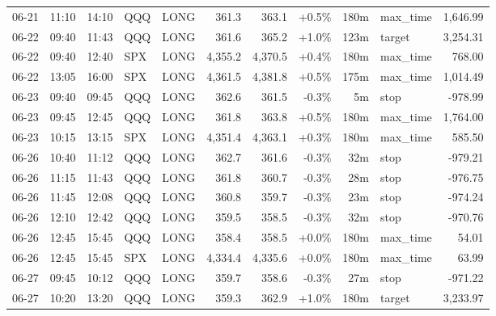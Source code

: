 \documentclass[11pt,a4paper,twoside]{article}
\begin{document}
\begin{center}
\begin{longtable}{>{\color{txtmain}}l l l l l r r r r >{\color{txtmain}}l r}
06-21 & 11:10 & 14:10 & QQQ & LONG & 361.3 & 363.1 & \textcolor{wingreen}{+0.5\%} & 180m & max\_time & \textcolor{wingreen}{1,646.99} \\
06-22 & 09:40 & 11:43 & QQQ & LONG & 361.6 & 365.2 & \textcolor{wingreen}{+1.0\%} & 123m & target & \textcolor{wingreen}{3,254.31} \\
06-22 & 09:40 & 12:40 & SPX & LONG & 4,355.2 & 4,370.5 & \textcolor{wingreen}{+0.4\%} & 180m & max\_time & \textcolor{wingreen}{768.00} \\
06-22 & 13:05 & 16:00 & SPX & LONG & 4,361.5 & 4,381.8 & \textcolor{wingreen}{+0.5\%} & 175m & max\_time & \textcolor{wingreen}{1,014.49} \\
06-23 & 09:40 & 09:45 & QQQ & LONG & 362.6 & 361.5 & \textcolor{lossred}{-0.3\%} & 5m & stop & \textcolor{lossred}{-978.99} \\
06-23 & 09:45 & 12:45 & QQQ & LONG & 361.8 & 363.8 & \textcolor{wingreen}{+0.5\%} & 180m & max\_time & \textcolor{wingreen}{1,764.00} \\
06-23 & 10:15 & 13:15 & SPX & LONG & 4,351.4 & 4,363.1 & \textcolor{wingreen}{+0.3\%} & 180m & max\_time & \textcolor{wingreen}{585.50} \\
06-26 & 10:40 & 11:12 & QQQ & LONG & 362.7 & 361.6 & \textcolor{lossred}{-0.3\%} & 32m & stop & \textcolor{lossred}{-979.21} \\
06-26 & 11:15 & 11:43 & QQQ & LONG & 361.8 & 360.7 & \textcolor{lossred}{-0.3\%} & 28m & stop & \textcolor{lossred}{-976.75} \\
06-26 & 11:45 & 12:08 & QQQ & LONG & 360.8 & 359.7 & \textcolor{lossred}{-0.3\%} & 23m & stop & \textcolor{lossred}{-974.24} \\
06-26 & 12:10 & 12:42 & QQQ & LONG & 359.5 & 358.5 & \textcolor{lossred}{-0.3\%} & 32m & stop & \textcolor{lossred}{-970.76} \\
06-26 & 12:45 & 15:45 & QQQ & LONG & 358.4 & 358.5 & \textcolor{wingreen}{+0.0\%} & 180m & max\_time & \textcolor{wingreen}{54.01} \\
06-26 & 12:45 & 15:45 & SPX & LONG & 4,334.4 & 4,335.6 & \textcolor{wingreen}{+0.0\%} & 180m & max\_time & \textcolor{wingreen}{63.99} \\
06-27 & 09:45 & 10:12 & QQQ & LONG & 359.7 & 358.6 & \textcolor{lossred}{-0.3\%} & 27m & stop & \textcolor{lossred}{-971.22} \\
06-27 & 10:20 & 13:20 & QQQ & LONG & 359.3 & 362.9 & \textcolor{wingreen}{+1.0\%} & 180m & target & \textcolor{wingreen}{3,233.97} \\

\end{longtable}
\end{center}
\end{document}
